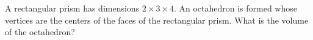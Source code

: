 A rectangular prism has dimensions $2 \times 3  \times 4$. An octahedron is formed whose vertices are the centers of the faces of the rectangular prism. What is the volume of the octahedron?
